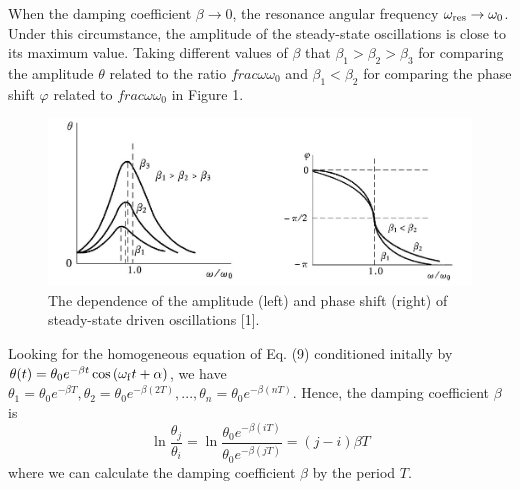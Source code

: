 \documentclass[a4paper]{report}
\begin{document}
	When the damping coefficient $\beta\rightarrow0$, the resonance angular frequency $\omega_{\rm{res}}\rightarrow\omega_0$. Under this circumstance, the amplitude of the steady-state oscillations is close to its maximum value. Taking different values of $\beta$ that $\beta_1>\beta_2>\beta_3$ for comparing the amplitude $\theta$ related to the ratio $frac{\omega}{\omega_0}$ and $\beta_1<\beta_2$ for comparing the phase shift  $\varphi$ related to $frac{\omega}{\omega_0}$ in Figure 1.
	\begin{figure}[H]
		\centering
		\includegraphics[width=1\linewidth]{1.jpg}
		\caption{The dependence of the amplitude (left) and phase shift (right) of steady-state driven oscillations [1].}
	\end{figure}
	Looking for the homogeneous equation of Eq. (9) conditioned initally by $\theta(t)=\theta_0e^{-\beta t}\cos{(\omega_{\rm f} t+\alpha)}$, we have $\theta_1=\theta_0e^{-\beta T},\theta_2=\theta_0e^{-\beta(2T)},...,\theta_n=\theta_0e^{-\beta(nT)}$. Hence, the damping coefficient $\beta$ is
	\begin{equation}
	\ln{\frac{\theta_j}{\theta_i}}=\ln{\frac{\theta_0e^{-\beta(iT)}}{\theta_0e^{-\beta(jT)}}}=(j-i)\beta T
	\end{equation}
	where we can calculate the damping coefficient $\beta$ by the period $T$.
\end{document}
